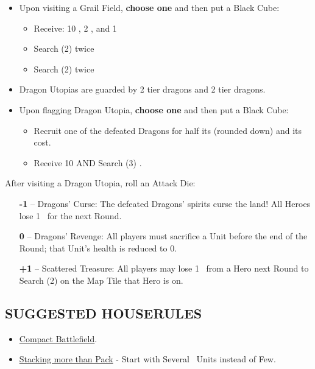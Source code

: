 \begin{multicols*}{2}
\begin{itemize}
  \item Upon visiting a Grail Field, \textbf{choose one} and then put a Black Cube:
  \begin{itemize}
    \item Receive: 10 , 2 , and 1 
    \item Search (2)  twice
    \item Search (2)  twice
  \end{itemize}
  \item Dragon Utopias are guarded by 2 \azure\-tier dragons and 2 \golden\-tier dragons.
  \item Upon flagging Dragon Utopia, \textbf{choose one} and then put a Black Cube:
  \begin{itemize}
    \item Recruit one of the defeated Dragons for half its  (rounded down) and its  cost.
    \item Receive 10  AND Search (3) .
  \end{itemize}
\end{itemize}
After visiting a Dragon Utopia, roll an Attack Die:
\begin{itemize}
  \item[\textbf{-1}] -- Dragons' Curse: The defeated Dragons’ spirits curse the land! All Heroes lose \mbox{1 } for the next Round.
  \item[\textbf{0}] -- Dragons' Revenge: All players must sacrifice a Unit before the end of the Round; that Unit's health is reduced to 0.
  \item[ \textbf{+1}] -- Scattered Treasure: All players may lose \mbox{1 } from a Hero next Round to Search (2)  on the Map Tile that Hero is on.
\end{itemize}

\subsection*{\MakeUppercase{Suggested Houserules}}
\begin{itemize}
  \item \href{https://boardgamegeek.com/thread/3445901/custom-hex-combat-board}{Compact Battlefield}.
  \item \href{https://boardgamegeek.com/thread/3449937/houserule-for-stacking-more-than-pack}{Stacking more than Pack} - Start with Several \bronze\ Units instead of Few.
\end{itemize}

\vspace*{\fill}

\end{multicols*}

